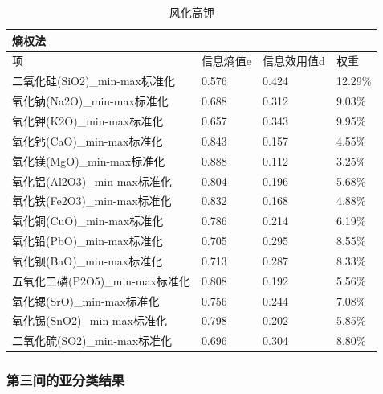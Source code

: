 \documentclass[UTF8]{ctexart}
\begin{document}
\begin{table}[H]
    \centering
    \caption{风化高钾}
    \begin{tabular}{|l|l|l|l|}
        \hline
        熵权法                          & ~         & ~           & ~       \\ \hline
        项                              & 信息熵值e & 信息效用值d & 权重    \\ \hline
        二氧化硅(SiO2)\_min-max标准化   & 0.576     & 0.424       & 12.29\% \\ \hline
        氧化钠(Na2O)\_min-max标准化     & 0.688     & 0.312       & 9.03\%  \\ \hline
        氧化钾(K2O)\_min-max标准化      & 0.657     & 0.343       & 9.95\%  \\ \hline
        氧化钙(CaO)\_min-max标准化      & 0.843     & 0.157       & 4.55\%  \\ \hline
        氧化镁(MgO)\_min-max标准化      & 0.888     & 0.112       & 3.25\%  \\ \hline
        氧化铝(Al2O3)\_min-max标准化    & 0.804     & 0.196       & 5.68\%  \\ \hline
        氧化铁(Fe2O3)\_min-max标准化    & 0.832     & 0.168       & 4.88\%  \\ \hline
        氧化铜(CuO)\_min-max标准化      & 0.786     & 0.214       & 6.19\%  \\ \hline
        氧化铅(PbO)\_min-max标准化      & 0.705     & 0.295       & 8.55\%  \\ \hline
        氧化钡(BaO)\_min-max标准化      & 0.713     & 0.287       & 8.33\%  \\ \hline
        五氧化二磷(P2O5)\_min-max标准化 & 0.808     & 0.192       & 5.56\%  \\ \hline
        氧化锶(SrO)\_min-max标准化      & 0.756     & 0.244       & 7.08\%  \\ \hline
        氧化锡(SnO2)\_min-max标准化     & 0.798     & 0.202       & 5.85\%  \\ \hline
        二氧化硫(SO2)\_min-max标准化    & 0.696     & 0.304       & 8.80\%  \\ \hline
    \end{tabular}
\end{table}

\subsubsection*{第三问的亚分类结果}
\end{document}
